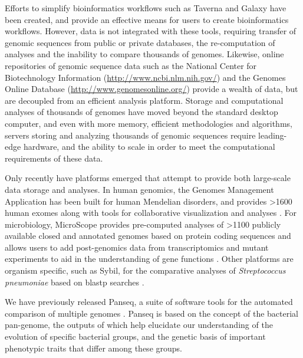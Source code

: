 \documentclass[a4paper,twoside]{article}
\begin{document}
Efforts to simplify bioinformatics workflows such as Taverna \cite{lanzen_taverna_2008} and Galaxy \cite{goecks_galaxy:_2010} have been created, and provide an effective means for users to create bioinformatics workflows. However, data is not integrated with these tools, requiring transfer of genomic sequences from public or private databases, the re-computation of analyses and the inability to compare thousands of genomes. Likewise, online repositories of genomic sequence data such as the National Center for Biotechnology Information (\url{http://www.ncbi.nlm.nih.gov/}) and the Genomes Online Database (\url{http://www.genomesonline.org/}) provide a wealth of data, but are decoupled from an efficient analysis platform. Storage and computational analyses of thousands of genomes have moved beyond the standard desktop computer, and even with more memory, efficient methodologies and algorithms, servers storing and analyzing thousands of genomic sequences require leading-edge hardware, and the ability to scale in order to meet the computational requirements of these data.

Only recently have platforms emerged that attempt to provide both large-scale data storage and analyses. In human genomics, the Genomes Management Application has been built for human Mendelian disorders, and provides >1600 human exomes along with tools for collaborative visualization and analyses \cite{gonzalez_genomes_2013}. For microbiology, MicroScope provides pre-computed analyses of >1100 publicly available closed and annotated genomes based on protein coding sequences and allows users to add post-genomics data from transcriptomics and mutant experiments to aid in the understanding of gene functions \cite{vallenet_microscope--integrated_2012}. Other platforms are organism specific, such as Sybil, for the comparative analyses of \textit{Streptococcus pneumoniae} based on blastp searches \cite{riley_using_2012}.

We have previously released Panseq, a suite of software tools for the automated comparison of multiple genomes \cite{laing_pan-genome_2010,laing_identification_2011}. Panseq is based on the concept of the bacterial pan-genome, the outputs of which help elucidate our understanding of the evolution of specific bacterial groups, and the genetic basis of important phenotypic traits that differ among these groups.
\end{document}

